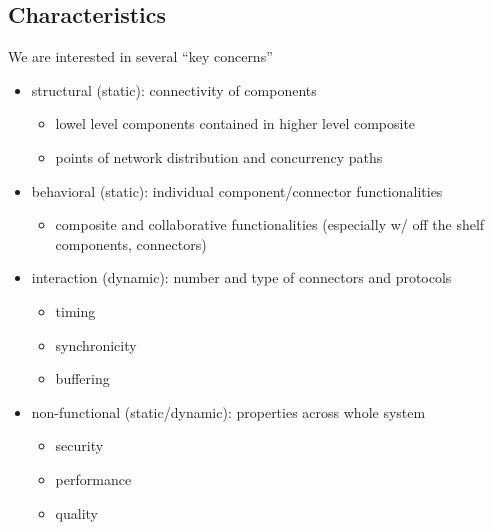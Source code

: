\documentclass[]{article}
\theoremstyle{definition}
\begin{document}
	\subsection{Characteristics}
	We are interested in several ``key concerns''
	\begin{itemize}
		\item structural (static): connectivity of components
			\begin{itemize}
				\item lowel level components contained in higher level composite
				\item points of network distribution and concurrency paths
			\end{itemize}
		\item behavioral (static): individual component/connector functionalities
			\begin{itemize}
				\item composite and collaborative functionalities (especially w/ off the shelf components, connectors)
			\end{itemize}
		\item interaction (dynamic):  number and type of connectors and protocols
			\begin{itemize}
				\item timing 
				\item synchronicity
				\item buffering
			\end{itemize}
		\item non-functional (static/dynamic): properties across whole system
			\begin{itemize}
				\item security
				\item performance
				\item quality
			\end{itemize}
	\end{itemize}
\end{document}
